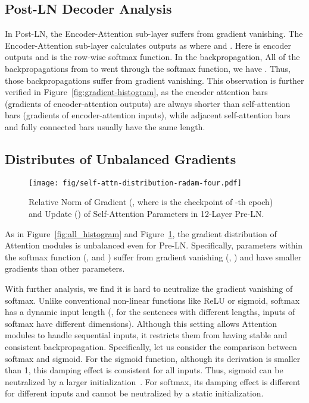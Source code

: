 \subsection{Post-LN Decoder Analysis}
\label{subsec:postln_decoder_analysis}
In Post-LN, the Encoder-Attention sub-layer suffers from gradient vanishing. 
The Encoder-Attention sub-layer calculates outputs as 
 where  and . 
Here  is encoder outputs and  is the row-wise softmax function. 
In the backpropagation, 
All of the backpropagations from  to  went through the softmax function, we have . 
Thus, those backpropagations suffer from gradient vanishing. 
This observation is further verified in Figure~\ref{fig:gradient-histogram}, as the encoder attention bars (gradients of encoder-attention outputs) are always shorter than self-attention bars (gradients of encoder-attention inputs), while adjacent self-attention bars and fully connected bars usually have the same length. 


\subsection{Distributes of Unbalanced Gradients}
\label{subsec:attention_gradients}

\begin{figure}[t]
\centering
\texttt{[image: fig/self-attn-distribution-radam-four.pdf]}
\caption{
Relative Norm of Gradient (, where  is the checkpoint of -th epoch) and Update () of Self-Attention Parameters in 12-Layer Pre-LN.
}
\label{fig:update-with-gradient-four}
\end{figure}

As in Figure~\ref{fig:all_histogram} and Figure~\ref{fig:update-with-gradient-four}, the gradient distribution of Attention modules is unbalanced even for Pre-LN. 
Specifically, parameters within the softmax function (\ie,  and ) suffer from gradient vanishing (\ie, ) and have smaller gradients than other parameters.

With further analysis, we find it is hard to neutralize the gradient vanishing of softmax. 
Unlike conventional non-linear functions like ReLU or sigmoid, softmax has a dynamic input length (\ie, for the sentences with different lengths, inputs of softmax have different dimensions). 
Although this setting allows Attention modules to handle sequential inputs, it restricts them from having stable and consistent backpropagation. 
Specifically, let us consider the comparison between softmax and sigmoid. 
For the sigmoid function, although its derivation is smaller than 1, this damping effect is consistent for all inputs. 
Thus, sigmoid can be neutralized by a larger initialization~\cite{Glorot2010UnderstandingTD}. 
For softmax, its damping effect is different for different inputs and cannot be neutralized by a static initialization. 


